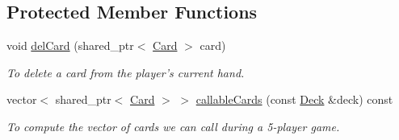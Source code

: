 \subsection*{Protected Member Functions}
\begin{DoxyCompactItemize}
\item 
void \hyperlink{classPlayer_a82c40ddca5214bbc9cc204ae9b789ca7}{del\-Card} (shared\-\_\-ptr$<$ \hyperlink{classCard}{Card} $>$ card)
\begin{DoxyCompactList}\small\item\em To delete a card from the player's current hand. \end{DoxyCompactList}\item 
vector$<$ shared\-\_\-ptr$<$ \hyperlink{classCard}{Card} $>$ $>$ \hyperlink{classPlayer_a2880662cb5f5cc2e778242c7a1477b30}{callable\-Cards} (const \hyperlink{classDeck}{Deck} \&deck) const 
\begin{DoxyCompactList}\small\item\em To compute the vector of cards we can call during a 5-\/player game. \end{DoxyCompactList}\end{DoxyCompactItemize}
